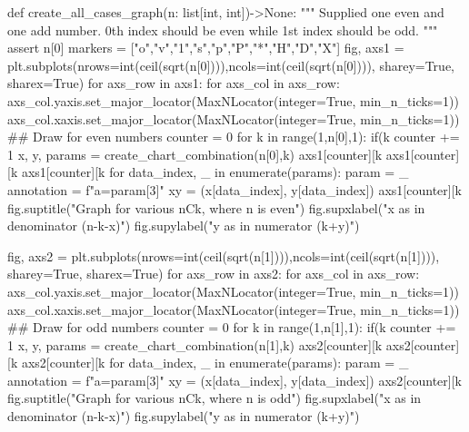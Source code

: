 \documentclass[10pt, twoside]{article}
\begin{document}
\begin{appendices}
\begin{python}
{def create_all_cases_graph(n: list[int, int])->None:
    """
    Supplied one even and one add number. 0th index should be even while 1st index should be odd.
    """
    assert n[0]%
    markers = ["o","v","1","s","p","P","*","H","D","X"]
    fig, axs1 = plt.subplots(nrows=int(ceil(sqrt(n[0]))),ncols=int(ceil(sqrt(n[0]))), sharey=True, sharex=True)
    for axs_row in axs1:
        for axs_col in axs_row:
            axs_col.yaxis.set_major_locator(MaxNLocator(integer=True, min_n_ticks=1))
            axs_col.xaxis.set_major_locator(MaxNLocator(integer=True, min_n_ticks=1))
    ## Draw for even numbers
    counter = 0
    for k in range(1,n[0],1):
        if(k%
            counter += 1        
        x, y, params = create_chart_combination(n[0],k)
        axs1[counter][k%
        axs1[counter][k%
        axs1[counter][k%
        for data_index, _ in enumerate(params):
            param = _
            annotation = f"a={param[3]}"
            xy = (x[data_index], y[data_index])
            axs1[counter][k%
    fig.suptitle("Graph for various nCk, where n is even")
    fig.supxlabel("x as in denominator (n-k-x)")
    fig.supylabel("y as in numerator (k+y)")
    
    fig, axs2 = plt.subplots(nrows=int(ceil(sqrt(n[1]))),ncols=int(ceil(sqrt(n[1]))), sharey=True, sharex=True)
    for axs_row in axs2:
        for axs_col in axs_row:
            axs_col.yaxis.set_major_locator(MaxNLocator(integer=True, min_n_ticks=1))
            axs_col.xaxis.set_major_locator(MaxNLocator(integer=True, min_n_ticks=1))    
    ## Draw for odd numbers
    counter = 0
    for k in range(1,n[1],1):
        if(k%
            counter += 1        
        x, y, params = create_chart_combination(n[1],k)
        axs2[counter][k%
        axs2[counter][k%
        axs2[counter][k%
        for data_index, _ in enumerate(params):
            param = _
            annotation = f"a={param[3]}"
            xy = (x[data_index], y[data_index]) 
            axs2[counter][k%
    fig.suptitle("Graph for various nCk, where n is odd")
    fig.supxlabel("x as in denominator (n-k-x)")
    fig.supylabel("y as in numerator (k+y)")

}
\end{python}
\end{appendices}
\end{document}

